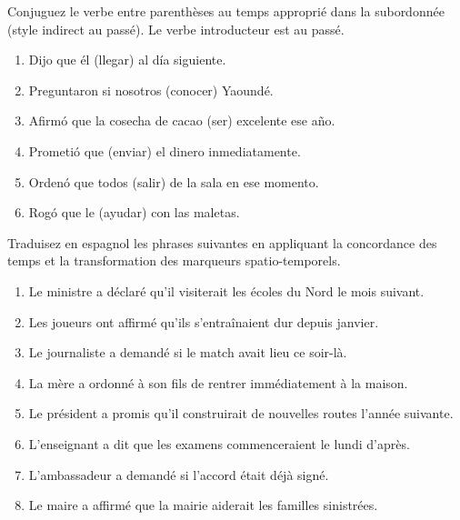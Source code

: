 \documentclass[11pt]{article}
\newcounter{popsec}
\newcounter{popsub}
\newcommand{\courssub}[1]{%
  \stepcounter{popsub}%
  \par\vspace{9pt}\noindent{\popxbold\fontsize{11.5}{13}\selectfont\color{popink}{\color{poporange}\thepopsec.\thepopsub}\hspace{6pt}#1}\par\nopagebreak\vspace{4pt}
}
\begin{document}
\begin{exercice}
Conjuguez le verbe entre parenthèses au temps approprié dans la subordonnée (style indirect au passé). Le verbe introducteur est au passé.
\begin{enumerate}
\item Dijo que él \underline{\hspace{2cm}} (llegar) al día siguiente.
\item Preguntaron si nosotros \underline{\hspace{2cm}} (conocer) Yaoundé.
\item Afirmó que la cosecha de cacao \underline{\hspace{2cm}} (ser) excelente ese año.
\item Prometió que \underline{\hspace{2cm}} (enviar) el dinero inmediatamente.
\item Ordenó que todos \underline{\hspace{2cm}} (salir) de la sala en ese momento.
\item Rogó que le \underline{\hspace{2cm}} (ayudar) con las maletas.
\end{enumerate}
\end{exercice}

\courssub{Je m'entraîne}

\begin{exercice}
Traduisez en espagnol les phrases suivantes en appliquant la concordance des temps et la transformation des marqueurs spatio-temporels.
\begin{enumerate}
\item Le ministre a déclaré qu'il visiterait les écoles du Nord le mois suivant.
\item Les joueurs ont affirmé qu'ils s'entraînaient dur depuis janvier.
\item Le journaliste a demandé si le match avait lieu ce soir-là.
\item La mère a ordonné à son fils de rentrer immédiatement à la maison.
\item Le président a promis qu'il construirait de nouvelles routes l'année suivante.
\item L'enseignant a dit que les examens commenceraient le lundi d'après.
\item L'ambassadeur a demandé si l'accord était déjà signé.
\item Le maire a affirmé que la mairie aiderait les familles sinistrées.
\end{enumerate}
\end{exercice}
\end{document}
